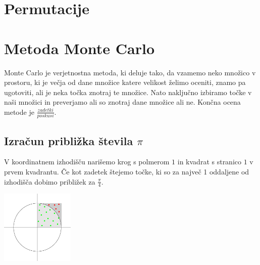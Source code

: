\documentclass[10pt,a4paper,oneside]{book}
\begin{document}
\section{Permutacije}


\section{Metoda Monte Carlo}
Monte Carlo je verjetnostna metoda, ki deluje tako, da vzamemo neko množico v prostoru, ki je večja od dane množice katere velikost želimo oceniti, znamo pa ugotoviti, ali je neka točka znotraj te množice. Nato naključno izbiramo točke v naši množici in preverjamo ali so znotraj dane množice ali ne. Končna ocena metode je $\frac{zadetki}{poskusi}$.
\subsection{Izračun približka števila $\pi$}
V koordinatnem izhodišču narišemo krog s polmerom $1$ in kvadrat s stranico $1$ v prvem kvadrantu. Če kot zadetek štejemo točke, ki so za največ 1 oddaljene od izhodišča dobimo približek za $\frac{\pi}{4}$.

\begin{center}
	\includegraphics[width=35mm]{MonteCarloPi}

\end{center}
\end{document}
